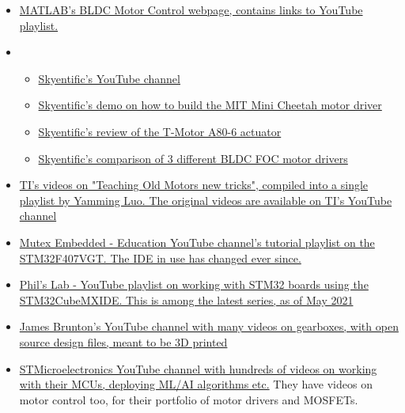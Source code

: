 \documentclass[a4paper]{article}
\begin{document}
		\begin{itemize}
			\item \href{https://in.mathworks.com/solutions/power-electronics-control/bldc-motor-control.html}{MATLAB's BLDC Motor Control webpage, contains links to YouTube playlist.}
			\item \begin{itemize}
				\item \href{https://www.youtube.com/c/Skyentific/videos}{Skyentific's YouTube channel}
				\item \href{https://www.youtube.com/watch?v=WKRLlthr9kY}{Skyentific's demo on how to build the MIT Mini Cheetah motor driver}
				\item \href{https://www.youtube.com/watch?v=HzY9vzgPZkA}{Skyentific's review of the T-Motor A80-6 actuator}
				\item \href{https://www.youtube.com/watch?v=Wb1gsJ4K4pM}{Skyentific's comparison of 3 different BLDC FOC motor drivers}
			\end{itemize}
			\item \href{https://www.youtube.com/playlist?list=PLQFVvDcd2teniWVcMVeDBWkRVxNjirC6K}{TI's videos on "Teaching Old Motors new tricks", compiled into a single playlist by Yamming Luo. The original videos are available on TI's YouTube channel}
			\item \href {https://www.youtube.com/watch?v=uJvPwxa5n00&list=PLfExI9i0v1sn_lQjCFJHrDSpvZ8F2CpkA}{Mutex Embedded - Education YouTube channel's tutorial playlist on the STM32F407VGT. The IDE in use has changed ever since.}
			\item \href{https://www.youtube.com/playlist?list=PLXSyc11qLa1a4Tqbz228dPZfMrs-KRpzA}{Phil's Lab - YouTube playlist on working with STM32 boards using the STM32CubeMXIDE. This is among the latest series, as of May 2021}
			\item \href{https://www.youtube.com/c/jamesbruton/videos}{James Brunton's YouTube channel with many videos on gearboxes, with open source design files, meant to be 3D printed}
			\item \href{https://www.youtube.com/c/stmicroelectronics/playlists}{STMicroelectronics YouTube channel with hundreds of videos on working with their MCUs, deploying ML/AI algorithms etc.} They have videos on motor control too, for their portfolio of motor drivers and MOSFETs.
		\end{itemize}
\end{document}
